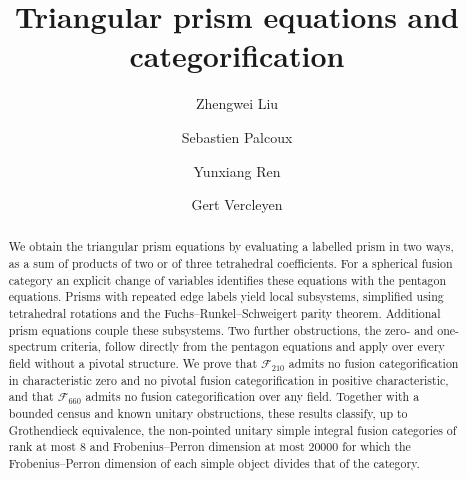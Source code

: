 \documentclass{amsart}
\begin{document}
\title[Triangular prism equations and categorification]{Triangular prism equations and categorification}

\author{Zhengwei Liu}
\address{Z. Liu, Yau Mathematical Sciences Center and Department of Mathematics, Tsinghua University, and Beijing Institute of Mathematical Sciences and Applications, Huairou District, Beijing, China}

\author{Sebastien Palcoux}
\address{S. Palcoux, Beijing Institute of Mathematical Sciences and Applications, Huairou District, Beijing, China}

\author{Yunxiang Ren}
\address{Y. Ren, LinkedIn Corporation, Sunnyvale, CA, USA}

\author{Gert Vercleyen}
\address{G. Vercleyen, Department of Mathematics, Purdue University, West Lafayette, IN 47907, USA}


\date{}
\begin{abstract}
We obtain the triangular prism equations by evaluating a labelled prism in two ways, as a sum of products of two or of three tetrahedral coefficients. For a spherical fusion category an explicit change of variables identifies these equations with the pentagon equations. Prisms with repeated edge labels yield local subsystems, simplified using tetrahedral rotations and the Fuchs--Runkel--Schweigert parity theorem. Additional prism equations couple these subsystems. Two further obstructions, the zero- and one-spectrum criteria, follow directly from the pentagon equations and apply over every field without a pivotal structure. We prove that $\mathcal F_{210}$ admits no fusion categorification in characteristic zero and no pivotal fusion categorification in positive characteristic, and that $\mathcal F_{660}$ admits no fusion categorification over any field. Together with a bounded census and known unitary obstructions, these results classify, up to Grothendieck equivalence, the non-pointed unitary simple integral fusion categories of rank at most $8$ and Frobenius--Perron dimension at most $20000$ for which the Frobenius--Perron dimension of each simple object divides that of the category.
\end{abstract}
\maketitle
\end{document}
